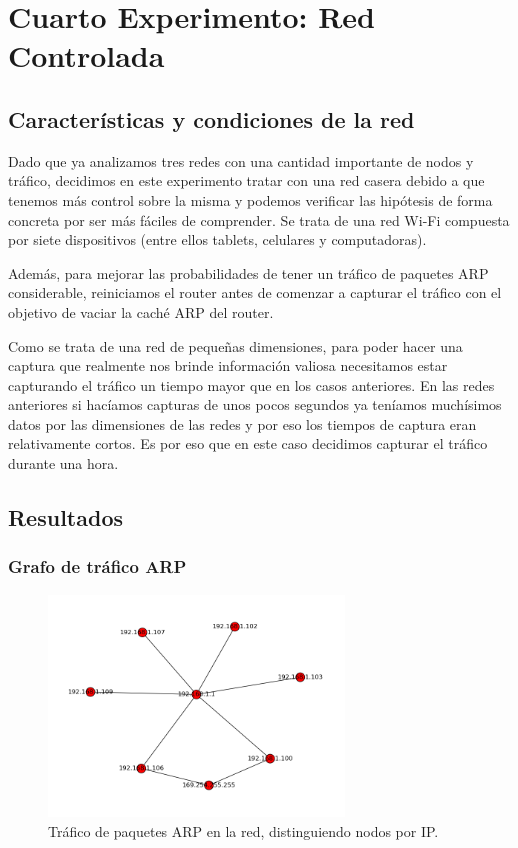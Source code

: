 \documentclass{article}
\theoremstyle{definition}
\theoremstyle{remark}
\begin{document}
\newpage

\section{Cuarto Experimento: Red Controlada}

\subsection{Características y condiciones de la red}

Dado que ya analizamos tres redes con una cantidad importante de nodos y tráfico, decidimos en este experimento tratar con una red casera debido a que tenemos más control sobre la misma y podemos verificar las hipótesis de forma concreta por ser más fáciles de comprender. Se trata de una red Wi-Fi compuesta por siete dispositivos (entre ellos tablets, celulares y computadoras).

Además, para mejorar las probabilidades de tener un tráfico de paquetes ARP considerable, reiniciamos el router antes de comenzar a capturar el tráfico con el objetivo de vaciar la caché ARP del router.

Como se trata de una red de pequeñas dimensiones, para poder hacer una captura que realmente nos brinde información valiosa necesitamos estar capturando el tráfico un tiempo mayor que en los casos anteriores. En las redes anteriores si hacíamos capturas de unos pocos segundos ya teníamos muchísimos datos por las dimensiones de las redes y por eso los tiempos de captura eran relativamente cortos. Es por eso que en este caso decidimos capturar el tráfico durante una hora.

\subsection{Resultados}

\subsubsection{Grafo de tráfico ARP}
\begin{figure}[H]
    \centering
    \includegraphics[width=0.70\textwidth]{../captures/CasaGerman/conn_ip.png}
    \caption{Tráfico de paquetes ARP en la red, distinguiendo nodos por IP.}
    \label{fig:mesh1}
\end{figure}
\end{document}
